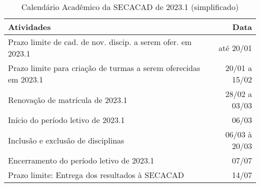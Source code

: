 \begin{table}[H] \centering \caption{Calendário Acadêmico da SECACAD de 2023.1 (simplificado)} \label{tab:calendario_SECACAD-2023.1}
  \begin{tabular}{| l r |}
    \hline
    \textbf{Atividades}                                              & \textbf{Data} \\
    \hline
    Prazo limite de cad. de nov. discip. a serem ofer. em 2023.1     & até 20/01     \\
    Prazo limite para criação de turmas a serem oferecidas em 2023.1 & 20/01 a 15/02 \\
    Renovação de matrícula de 2023.1                                 & 28/02 a 03/03 \\
    Início do período letivo de 2023.1                               & 06/03         \\
    Inclusão e exclusão de disciplinas                               & 06/03 à 20/03 \\
    Encerramento do período letivo de 2023.1                         & 07/07         \\
    Prazo limite: Entrega dos resultados à SECACAD                   & 14/07         \\
    \hline
  \end{tabular}
\end{table}

